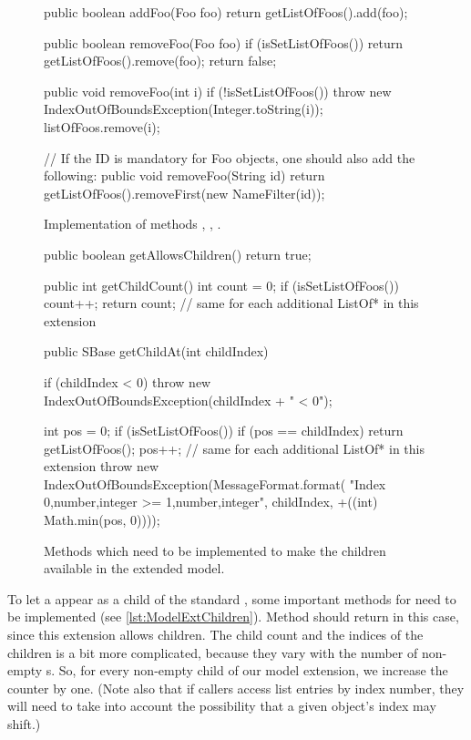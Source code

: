 \begin{figure}[t]
  \begin{example}[numbers=left]
public boolean addFoo(Foo foo) {
    return getListOfFoos().add(foo);
}

public boolean removeFoo(Foo foo) {
  if (isSetListOfFoos()) {
    return getListOfFoos().remove(foo);
  }
  return false;
}

public void removeFoo(int i) {
  if (!isSetListOfFoos()) {
    throw new IndexOutOfBoundsException(Integer.toString(i));
  }
  listOfFoos.remove(i);
}

// If the ID is mandatory for Foo objects, one should also add the following:
public void removeFoo(String id) {
  return getListOfFoos().removeFirst(new NameFilter(id));
}\end{example}
  \caption{Implementation of  methods ,
    , .}
  \label{lst:ModelExtAddRemoveFoos}
\end{figure}

\begin{figure}[hb]
  \begin{example}[numbers=left]
public boolean getAllowsChildren() {
  return true;
}

public int getChildCount() {
  int count = 0;
  if (isSetListOfFoos())
    count++;
  return count;  // same for each additional ListOf* in this extension
}

public SBase getChildAt(int childIndex) {
  if (childIndex < 0) {
    throw new IndexOutOfBoundsException(childIndex + " < 0");
  }

  int pos = 0;
  if (isSetListOfFoos()) {
    if (pos == childIndex)
      return getListOfFoos();
    pos++;
  }
  // same for each additional ListOf* in this extension
  throw new IndexOutOfBoundsException(MessageFormat.format(
    "Index {0,number,integer} >= {1,number,integer}", childIndex, +((int) Math.min(pos, 0))));
}\end{example}
  \caption{Methods which need to be implemented to make the children
    available in the extended model.}
  \label{lst:ModelExtChildren}
\end{figure}

To let a  appear as a child of the standard \Model, some
important methods for \TreeNode need to be implemented (see
\vref{lst:ModelExtChildren}).  Method  should
return  in this case, since this extension allows children.  The
child count and the indices of the children is a bit more complicated,
because they vary with the number of non-empty s.  So, for
every non-empty  child of our model extension, we increase the
counter by one.  (Note also that if callers access list entries by index
number, they will need to take into account the possibility that a given
object's index may shift.)


